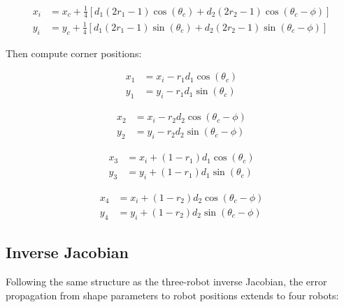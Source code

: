 \documentclass[lettersize,journal]{IEEEtran}
\begin{document}
\begin{equation}
\begin{aligned}
x_i &= x_c + \frac{1}{4}\left[d_1(2r_1 - 1)\cos(\theta_c) + d_2(2r_2 - 1)\cos(\theta_c - \phi)\right] \\
y_i &= y_c + \frac{1}{4}\left[d_1(2r_1 - 1)\sin(\theta_c) + d_2(2r_2 - 1)\sin(\theta_c - \phi)\right]
\end{aligned}
\end{equation}

Then compute corner positions:

\begin{equation}
\begin{aligned}
x_1 &= x_i - r_1 d_1 \cos(\theta_c) \\
y_1 &= y_i - r_1 d_1 \sin(\theta_c)
\end{aligned}
\end{equation}

\begin{equation}
\begin{aligned}
x_2 &= x_i - r_2 d_2 \cos(\theta_c - \phi) \\
y_2 &= y_i - r_2 d_2 \sin(\theta_c - \phi)
\end{aligned}
\end{equation}

\begin{equation}
\begin{aligned}
x_3 &= x_i + (1 - r_1) d_1 \cos(\theta_c) \\
y_3 &= y_i + (1 - r_1) d_1 \sin(\theta_c)
\end{aligned}
\end{equation}

\begin{equation}
\begin{aligned}
x_4 &= x_i + (1 - r_2) d_2 \cos(\theta_c - \phi) \\
y_4 &= y_i + (1 - r_2) d_2 \sin(\theta_c - \phi)
\end{aligned}
\end{equation}

\subsection{Inverse Jacobian}

Following the same structure as the three-robot inverse Jacobian, the error propagation from shape parameters to robot positions extends to four robots:
\end{document}
